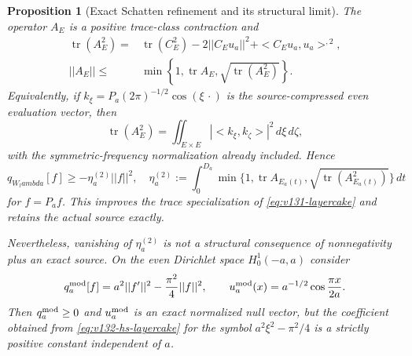 \documentclass[11pt]{article}
\def\lambda{lambda}%
\def\norm#1{||#1||}%
\def\ip#1#2{<#1,#2>}%
\newtheorem{proposition}[theorem]{Proposition}
\theoremstyle{remark}
\newcommand{\norm}[1]{\left\lVert #1\right\rVert}
\newcommand{\ip}[2]{\left\langle #1,#2\right\rangle}
\begin{document}
\begin{proposition}[Exact Schatten refinement and its structural limit]
\label{prop:v132-schatten}
The operator $A_E$ is a positive trace-class contraction and
\begin{align}
 \operatorname {tr}(A_E^2)
  ={}&\operatorname {tr}(C_E^2)-2\norm{C_Eu_a}^2
       +\ip{C_Eu_a}{u_a}^{,2},
 \label{eq:v132-hs-identity}\\
 \norm{A_E}
  \le{}&\min\left\{1,\operatorname {tr}A_E,
                  \sqrt{\operatorname {tr}(A_E^2)}\right\}.
 \label{eq:v132-hs-bound}
\end{align}
Equivalently, if
$k_\xi=P_a(2\pi)^{-1/2}\cos(\xi\,\cdot)$ is the
source-compressed even evaluation vector, then
\begin{equation}\label{eq:v132-hs-kernel}
 \operatorname {tr}(A_E^2)
   =\iint_{E\times E}|\ip{k_\xi}{k_\zeta}|^2\,d\xi\,d\zeta,
\end{equation}
with the symmetric-frequency normalization already included. Hence
\begin{equation}\label{eq:v132-hs-layercake}
 q_{W_\lambda}[f]\ge-\eta_a^{(2)}\norm f^2,
 \quad
 \eta_a^{(2)}:=\int_0^{D_a}
 \min\{1,\operatorname {tr}A_{E_a(t)},
       \sqrt{\operatorname {tr}(A_{E_a(t)}^2)}\}\,dt
\end{equation}
for $f=P_af$. This improves the trace specialization of
\eqref{eq:v131-layercake} and retains the actual source exactly.

Nevertheless, vanishing of $\eta_a^{(2)}$ is not a structural
consequence of nonnegativity plus an exact source. On the even
Dirichlet space $H_0^1(-a,a)$ consider
\[
 q_a^{\rm mod}[f]=a^2\norm{f'}^2-\frac{\pi^2}{4}\norm f^2,
 \qquad
 u_a^{\rm mod}(x)=a^{-1/2}\cos\frac{\pi x}{2a}.
\]
Then $q_a^{\rm mod}\ge0$ and $u_a^{\rm mod}$ is an exact normalized
null vector, but the coefficient obtained from
\eqref{eq:v132-hs-layercake} for the symbol
$a^2\xi^2-\pi^2/4$ is a strictly positive constant independent of
$a$.
\end{proposition}
\end{document}
